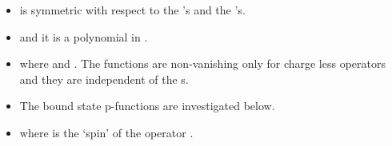 \documentclass[a4paper,12pt]{article}
\begin{document}
\begin{itemize}
\item[\myHighlight{$(i^{\prime })$}\coordHE{}]  \coordHE{} is symmetric with respect to the \myHighlight{$\theta $}\coordHE{}'s and the \coordHE{}'s.

\item[\myHighlight{$(ii^{\prime })$}\coordHE{}]  \coordHE{} and
it is a polynomial in \coordHE{}.

\item[\myHighlight{$(iii^{\prime })$}\coordHE{}]  \coordHE{}

where \coordHE{} and \cite{BFKZ} \coordHE{}. The functions \coordHE{} are non-vanishing only for charge less operators and
they are independent of the \coordHE{}s.

\item[\myHighlight{$(iv^{\prime })$}\coordHE{}]  The bound state p-functions are investigated below.

\item[\myHighlight{$(v^{\prime })$}\coordHE{}]  \coordHE{} where \coordHE{} is the `spin' of the operator \coordHE{}.
\end{itemize}
\end{document}

